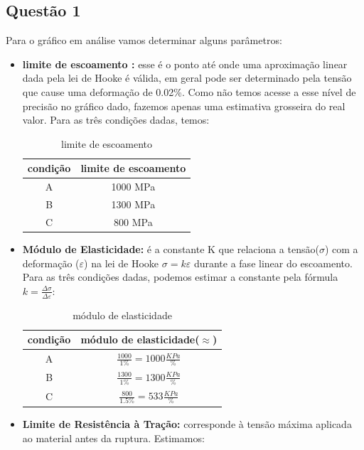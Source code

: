 \documentclass[journal]{IEEEtran}
\begin{document}
\subsection*{Questão 1}
Para o gráfico em análise vamos determinar alguns parâmetros:
\begin{itemize}
 \item \textbf{limite de escoamento : } 
 esse é o ponto até onde uma aproximação linear dada pela lei
 de Hooke é válida, em geral pode ser determinado pela tensão 
 que cause uma deformação de 0.02\%. Como não temos acesse a esse
 nível de precisão no gráfico dado, fazemos apenas uma estimativa 
 grosseira do real valor. Para as três condições dadas, temos:
 
 \begin{table}[!htp]
  \centering
  \begin{tabular}{|c|c|} \hline
  condição & limite de escoamento \\ \hline
  A & 1000 MPa \\ \hline
  B & 1300 MPa\\ \hline
  C & 800 MPa\\ \hline
  \end{tabular}
  \caption{limite de escoamento}
 \end{table}

  \item \textbf{Módulo de Elasticidade: } 
 é a constante K que relaciona a tensão($\sigma$) com a
 deformação ($\varepsilon$) na lei de Hooke $\sigma = k \varepsilon$
 durante a fase linear do escoamento. Para as três condições
 dadas, podemos estimar a constante pela fórmula $k = 
\frac{\Delta \sigma}{\Delta \varepsilon}$:
 \begin{table}[!htp]
  \centering
  \begin{tabular}{|c|c|} \hline
  condição & módulo de elasticidade($\approx$) \\ \hline
  A & $\frac{1000}{1\%} = 1000 \frac{KPa}{\%}$   \\ \hline
  B & $\frac{1300}{1\%} = 1300\frac{KPa}{\%}$\\ \hline
  C & $\frac{800}{1.5\%} = 533 \frac{KPa}{\%}$\\ \hline
  \end{tabular}
  \caption{módulo de elasticidade}
 \end{table}

   \item \textbf{Limite de Resistência à Tração: } 
corresponde à tensão máxima aplicada ao material antes da 
ruptura. Estimamos:
   

\end{itemize}
\end{document}
